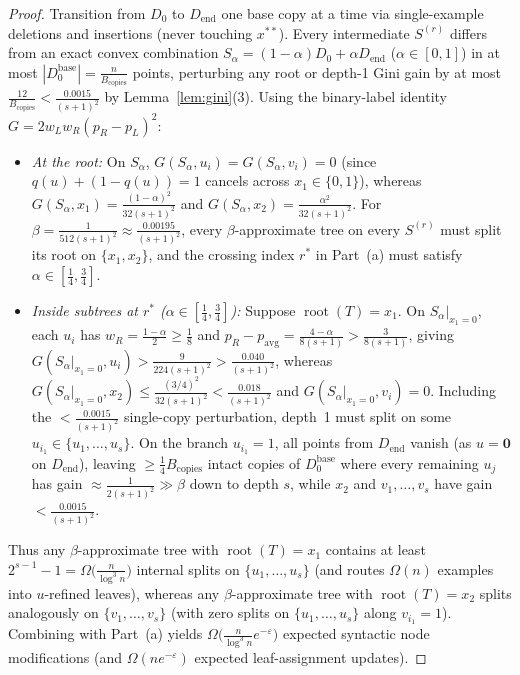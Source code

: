 \documentclass[11pt]{article}
\theoremstyle{definition}
\begin{document}
\begin{proof}
Transition from $D_0$ to $D_{\mathrm{end}}$ one base copy at a time via single-example deletions and insertions (never touching $x^{**}$). Every intermediate $S^{(r)}$ differs from an exact convex combination $S_\alpha = (1 - \alpha) D_0 + \alpha D_{\mathrm{end}}$ ($\alpha \in [0, 1]$) in at most $|D_0^{\mathrm{base}}| = \frac{n}{B_{\mathrm{copies}}}$ points, perturbing any root or depth-1 Gini gain by at most $\frac{12}{B_{\mathrm{copies}}} < \frac{0.0015}{(s+1)^2}$ by Lemma~\ref{lem:gini}(3). Using the binary-label identity $G = 2 w_L w_R (p_R - p_L)^2$:
\begin{itemize}[leftmargin=1.5em,itemsep=1pt]
    \item \emph{At the root:} On $S_\alpha$, $G(S_\alpha, u_i) = G(S_\alpha, v_i) = 0$ (since $q(u) + (1 - q(u)) = 1$ cancels across $x_1 \in \{0,1\}$), whereas $G(S_\alpha, x_1) = \frac{(1-\alpha)^2}{32(s+1)^2}$ and $G(S_\alpha, x_2) = \frac{\alpha^2}{32(s+1)^2}$. For $\beta = \frac{1}{512(s+1)^2} \approx \frac{0.00195}{(s+1)^2}$, every $\beta$-approximate tree on every $S^{(r)}$ must split its root on $\{x_1, x_2\}$, and the crossing index $r^*$ in Part~(a) must satisfy $\alpha \in [\frac{1}{4}, \frac{3}{4}]$.
    \item \emph{Inside subtrees at $r^*$ ($\alpha \in [\frac{1}{4}, \frac{3}{4}]$):} Suppose $\operatorname{root}(T) = x_1$. On $S_\alpha|_{x_1=0}$, each $u_i$ has $w_R = \frac{1-\alpha}{2} \ge \frac{1}{8}$ and $p_R - p_{\mathrm{avg}} = \frac{4-\alpha}{8(s+1)} > \frac{3}{8(s+1)}$, giving $G(S_\alpha|_{x_1=0}, u_i) > \frac{9}{224(s+1)^2} > \frac{0.040}{(s+1)^2}$, whereas $G(S_\alpha|_{x_1=0}, x_2) \le \frac{(3/4)^2}{32(s+1)^2} < \frac{0.018}{(s+1)^2}$ and $G(S_\alpha|_{x_1=0}, v_i) = 0$. Including the $< \frac{0.0015}{(s+1)^2}$ single-copy perturbation, depth~1 must split on some $u_{i_1} \in \{u_1, \dots, u_s\}$. On the branch $u_{i_1} = 1$, all points from $D_{\mathrm{end}}$ vanish (as $u = \mathbf{0}$ on $D_{\mathrm{end}}$), leaving $\ge \frac{1}{4} B_{\mathrm{copies}}$ intact copies of $D_0^{\mathrm{base}}$ where every remaining $u_j$ has gain $\approx \frac{1}{2(s+1)^2} \gg \beta$ down to depth $s$, while $x_2$ and $v_1, \dots, v_s$ have gain $< \frac{0.0015}{(s+1)^2}$.
\end{itemize}
Thus any $\beta$-approximate tree with $\operatorname{root}(T) = x_1$ contains at least $2^{s-1} - 1 = \Omega\big(\frac{n}{\log^3 n}\big)$ internal splits on $\{u_1, \dots, u_s\}$ (and routes $\Omega(n)$ examples into $u$-refined leaves), whereas any $\beta$-approximate tree with $\operatorname{root}(T) = x_2$ splits analogously on $\{v_1, \dots, v_s\}$ (with zero splits on $\{u_1, \dots, u_s\}$ along $v_{i_1} = 1$). Combining with Part~(a) yields $\Omega\big(\frac{n}{\log^3 n} e^{-\varepsilon}\big)$ expected syntactic node modifications (and $\Omega(n e^{-\varepsilon})$ expected leaf-assignment updates).
\end{proof}
\end{document}
